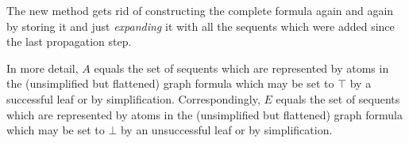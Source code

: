 \documentclass{llncs}
\begin{document}
The new method gets rid of constructing the complete formula again and again by storing it
and just \emph{expanding} it with all the sequents which were added since the last propagation
step.

In more detail, $A$ equals the set of sequents which are represented by atoms in the
(unsimplified but flattened) graph formula which may be set to $\top$ by a successful leaf or by simplification.
Correspondingly, $E$ equals the set of sequents which are represented by atoms in the
(unsimplified but flattened) graph formula which may be set to $\bot$ by an unsuccessful leaf or by simplification.\\



\end{document}
